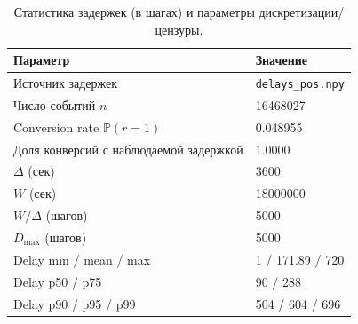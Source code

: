\begin{table}[t]
\centering
\caption{Статистика задержек (в шагах) и параметры дискретизации/цензуры.}
\label{tab:delay_stats}
\begin{tabular}{ll}
\toprule
Параметр & Значение \\
\midrule
Источник задержек & \texttt{delays_pos.npy} \\
Число событий $n$ & 16468027 \\
Conversion rate $\mathbb{P}(r=1)$ & 0.048955 \\
Доля конверсий с наблюдаемой задержкой & 1.0000 \\
$\Delta$ (сек) & 3600 \\
$W$ (сек) & 18000000 \\
$W/\Delta$ (шагов) & 5000 \\
$D_{\max}$ (шагов) & 5000 \\
Delay min / mean / max & 1 / 171.89 / 720 \\
Delay p50 / p75 & 90 / 288 \\
Delay p90 / p95 / p99 & 504 / 604 / 696 \\
\bottomrule
\end{tabular}
\end{table}
